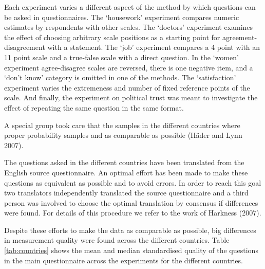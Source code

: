 \documentclass[a4paper,12pt]{article}
\begin{document}
	Each experiment varies a different aspect of the method by which questions can be asked in questionnaires. The `housework' experiment compares numeric estimates by respondents with other scales. The `doctors' experiment examines the effect of choosing arbitrary scale positions as a starting point for agreement-disagreement with a statement. The `job' experiment compares a 4 point with an 11 point scale and a true-false scale with a direct question. In the `women' experiment agree-disagree scales are reversed, there is one negative item, and a `don't know' category is omitted in one of the methods.  The `satisfaction' experiment varies the extremeness and number of fixed reference points of the scale. And finally, the experiment on political trust was meant to investigate the effect of repeating the same question in the same format.

A special group took care that the samples in the different countries where proper probability samples and as comparable as possible (H\"{a}der and Lynn 2007). 

The questions asked in the different countries have been translated from the English source questionnaire. An optimal effort has been made to make these questions as equivalent as possible and to avoid errors. In order to reach this goal two translators independently translated the source questionnaire and a third person was involved to choose the optimal translation by consensus if differences were found. For details of this procedure we refer to the work of Harkness (2007).

	 Despite these efforts to make the data as comparable as possible, big differences in measurement quality were found across the different countries.  Table \ref{tab:countries} shows the mean and median standardised quality of the questions in the main questionnaire across the experiments for the different countries.
\end{document}
